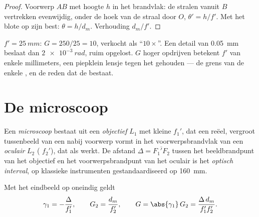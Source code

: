 \begin{proof}
Voorwerp $AB$ met hoogte $h$ in het brandvlak: de stralen vanuit $B$ vertrekken
evenwijdig, onder de hoek van de straal door $O$, $\theta' = h/f'$. Met het
blote  op zijn best: $\theta = h/d_m$. Verhouding $d_m/f'$.
\end{proof}

\begin{example}\label{ex:b1:optical-instruments:loupe}
$f' = \qty{25}{mm}$: $G = 250/25 = 10$, verkocht als ``$10\times$''. Een
detail van \qty{0.05}{mm} beslaat dan $\qty{2e-3}{rad}$, ruim opgelost.
$G$ hoger opdrijven betekent $f'$ van enkele millimeters, een piepklein
lensje tegen het  gehouden --- de grens van de enkele , en de reden
dat de  bestaat.
\end{example}

\section{De microscoop}

\begin{definition}\label{def:b1:optical-instruments:microscope}
Een \emph{microscoop} bestaat uit een \emph{objectief} $L_1$ met kleine
 $f_1'$, dat een reëel, vergroot tussenbeeld van een nabij
voorwerp vormt in het voorwerpsbrandvlak van een \emph{oculair} $L_2$
( $f_2'$), dat als  werkt. De afstand $\Delta =
\overline{F_1'F_2}$ tussen het beeldbrandpunt van het objectief en het
voorwerpsbrandpunt van het oculair is het \emph{optisch interval}, op
klassieke instrumenten gestandaardiseerd op \qty{160}{mm}.
\end{definition}

\begin{proposition}\label{prop:b1:optical-instruments:microscope}
Met het eindbeeld op oneindig geldt
\[
\gamma_1 = -\frac{\Delta}{f_1'}, \qquad G_2 = \frac{d_m}{f_2'},
\qquad G = \abs{\gamma_1}\,G_2 = \frac{\Delta\,d_m}{f_1' f_2'} .
\]
\end{proposition}

